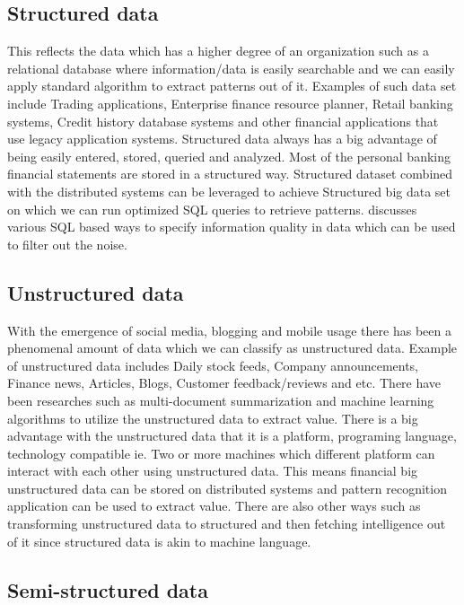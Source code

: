 \documentclass[sigconf]{acmart}
\begin{document}
\subsection{Structured data}

This reflects the data which has a higher degree of an organization such as a relational database where information/data is easily searchable and we can easily apply standard algorithm to extract patterns out of it. Examples of such data set include Trading applications, Enterprise finance resource planner, Retail banking systems, Credit history database systems and other financial applications that use legacy application systems. Structured data always has a big advantage of being easily entered, stored, queried and analyzed. Most of the personal banking financial statements are stored in a structured way. Structured dataset combined with the distributed systems can be leveraged to achieve Structured big data set on which we can run optimized SQL queries to retrieve patterns. \cite{Ref5}  discusses various SQL based ways to specify information quality in data which can be used to filter out the noise. 

\subsection{Unstructured data}

With the emergence of social media, blogging and mobile usage there has been a phenomenal amount of data which we can classify as unstructured data. Example of unstructured data includes Daily stock feeds, Company announcements, Finance news, Articles, Blogs, Customer feedback/reviews and etc. There have been researches such as multi-document summarization and machine learning algorithms to utilize the unstructured data to extract value.  There is a big advantage with the unstructured data that it is a platform, programing language, technology compatible ie. Two or more machines which different platform can interact with each other using unstructured data. This means financial big unstructured data can be stored on distributed systems and pattern recognition application can be used to extract value.   There are also other ways such as transforming unstructured data to structured and then fetching intelligence out of it since structured data is akin to machine language. 

\subsection{Semi-structured data}
\end{document}
